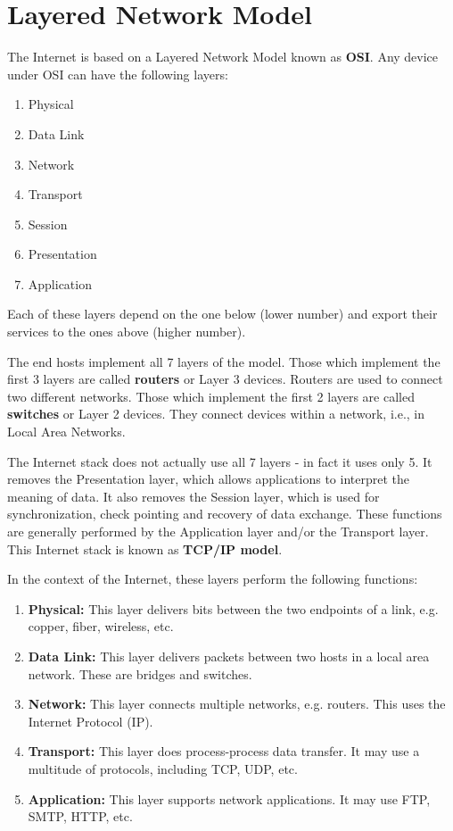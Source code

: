 \documentclass[12pt,letterpaper]{amsbook}
\theoremstyle{definition}
\begin{document}
\section{Layered Network Model}

The Internet is based on a Layered Network Model known as \textbf{OSI}. Any device under OSI can have the following layers:

\begin{enumerate}
  \item Physical
  \item Data Link
  \item Network
  \item Transport
  \item Session
  \item Presentation
  \item Application
\end{enumerate}

Each of these layers depend on the one below (lower number) and export their services to the ones above (higher number).

The end hosts implement all 7 layers of the model. Those which implement the first 3 layers are called \textbf{routers} or Layer 3 devices. Routers are used to connect two different networks. Those which implement the first 2 layers are called \textbf{switches} or Layer 2 devices. They connect devices within a network, i.e., in Local Area Networks.

The Internet stack does not actually use all 7 layers - in fact it uses only 5. It removes the Presentation layer, which allows applications to interpret the meaning of data. It also removes the Session layer, which is used for synchronization, check pointing and recovery of data exchange. These functions are generally performed by the Application layer and/or the Transport layer. This Internet stack is known as \textbf{TCP/IP model}.

In the context of the Internet, these layers perform the following functions:

\begin{enumerate}
  \item \textbf{Physical:} This layer delivers bits between the two endpoints of a link, e.g. copper, fiber, wireless, etc.
  \item \textbf{Data Link:} This layer delivers packets between two hosts in a local area network. These are bridges and switches.
  \item \textbf{Network:} This layer connects multiple networks, e.g. routers. This uses the Internet Protocol (IP).
  \item \textbf{Transport:} This layer does process-process data transfer. It may use a multitude of protocols, including TCP, UDP, etc.
  \item \textbf{Application:} This layer supports network applications. It may use FTP, SMTP, HTTP, etc.
\end{enumerate}
\end{document}
